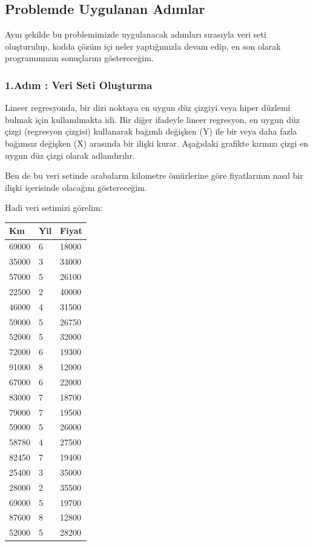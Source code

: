 \documentclass{article}
\begin{document}
\subsection{Problemde Uygulanan Adımlar}

\hspace{1cm} Aynı şekilde bu problemimizde uygulanacak adımları sırasıyla veri seti oluşturulup, kodda çözüm içi neler yaptığımızla devam edip, en son olarak programımızın sonuçlarını göstereceğim.

\subsubsection{1.Adım : Veri Seti Oluşturma}
\hspace{1cm} Lineer regresyonda, bir dizi noktaya en uygun düz çizgiyi veya hiper düzlemi bulmak için kullanılmakta idi. Bir diğer ifadeyle lineer regresyon, en uygun düz çizgi (regresyon çizgisi) kullanarak bağımlı değişken (Y) ile bir veya daha fazla bağımsız değişken (X) arasında bir ilişki kurar. Aşağıdaki grafikte kırmızı çizgi en uygun düz çizgi olarak adlandırılır.\par
Ben de bu veri setinde arabaların kilometre ömürlerine göre fiyatlarının nasıl bir ilişki içerisinde olacağını göstereceğim.\par
Hadi veri setimizi görelim:
\begin{center}
    
    
    \begin{tabular}{|l|l|l|}
    
    \hline
        Km & Yil & Fiyat \\ \hline
        69000 & 6 & 18000 \\ \hline
        35000 & 3 & 34000 \\ \hline
        57000 & 5 & 26100 \\ \hline
        22500 & 2 & 40000 \\ \hline
        46000 & 4 & 31500 \\ \hline
        59000 & 5 & 26750 \\ \hline
        52000 & 5 & 32000 \\ \hline
        72000 & 6 & 19300 \\ \hline
        91000 & 8 & 12000 \\ \hline
        67000 & 6 & 22000 \\ \hline
        83000 & 7 & 18700 \\ \hline
        79000 & 7 & 19500 \\ \hline
        59000 & 5 & 26000 \\ \hline
        58780 & 4 & 27500 \\ \hline
        82450 & 7 & 19400 \\ \hline
        25400 & 3 & 35000 \\ \hline
        28000 & 2 & 35500 \\ \hline
        69000 & 5 & 19700 \\ \hline
        87600 & 8 & 12800 \\ \hline
        52000 & 5 & 28200 \\ \hline
    \end{tabular}
    
\end{center}
\end{document}
